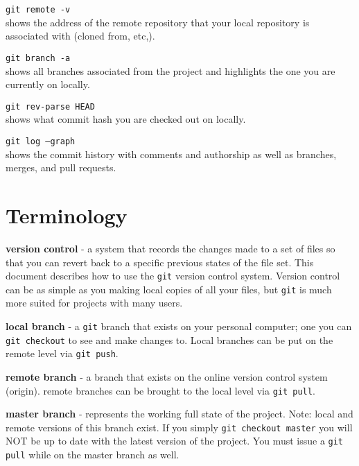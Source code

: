 \documentclass[10pt]{article}
\begin{document}
\texttt{git remote -v} \\
shows the address of the remote repository that your local repository is associated with (cloned from, etc,).

\texttt{git branch -a} \\
shows all branches associated from the project and highlights the one you are currently on locally.

\texttt{git rev-parse HEAD} \\
shows what commit hash you are checked out on locally.

\texttt{git log --graph} \\
shows the commit history with comments and authorship as well as branches, merges, and pull requests.


\section{Terminology}

\textbf{version control} - a system that records the changes made to a set of files so that you can revert back to a specific previous states of the file set. This document describes how to use the \texttt{git} version control system. Version control can be as simple as you making local copies of all your files, but \texttt{git} is much more suited for projects with many users.

\textbf{local branch} -  a \texttt{git} branch that exists on your personal computer; one you can \texttt{git checkout} to see and make changes to. Local branches can be put on the remote level via \texttt{git push}.

\textbf{remote branch} - a branch that exists on the online version control system (origin). remote branches can be brought to the local level via \texttt{git pull}.

\textbf{master branch} - represents the working full state of the project. Note: local and remote versions of this branch exist. If you simply \texttt{git checkout master} you will NOT be up to date with the latest version of the project. You must issue a \texttt{git pull} while on the master branch as well.
\end{document}
